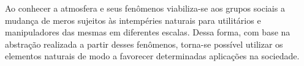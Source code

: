 	\newpar Ao conhecer a atmosfera e seus fenômenos viabiliza-se aos grupos sociais a mudança de meros sujeitos às intempéries naturais para utilitários e manipuladores das mesmas em diferentes escalas. Dessa forma, com base na abstração realizada a partir desses fenômenos, torna-se possível utilizar os elementos naturais de modo a favorecer determinadas aplicações na sociedade. 